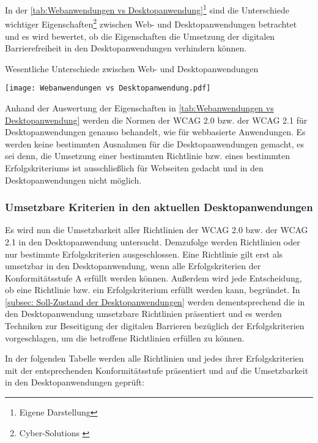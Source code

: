 In der \cref{tab:Webanwendungen vs Desktopanwendung}\footnote{Eigene Darstellung} sind die Unterschiede wichtiger Eigenschaften\footnote{Cyber-Solutions \cite{CyberSolutions}} zwischen Web- und Desktopanwendungen betrachtet und es wird bewertet, ob die Eigenschaften die Umsetzung der digitalen Barrierefreiheit in den Desktopanwendungen verhindern können.

\begin{table}[H]
	\caption{Wesentliche Unterschiede zwischen  Web- und Desktopanwendungen}
	\label{tab:Webanwendungen vs Desktopanwendung}
	\centering
	\texttt{[image: Webanwendungen vs Desktopanwendung.pdf]}
\end{table}

Anhand der Auswertung der Eigenschaften in \cref{tab:Webanwendungen vs Desktopanwendung} werden die Normen der \ac{WCAG} 2.0 bzw. der \ac{WCAG} 2.1 für Desktopanwendungen genauso behandelt, wie für webbasierte Anwendungen. Es werden keine bestimmten Ausnahmen für die Desktopanwendungen gemacht, es sei denn, die Umsetzung einer bestimmten Richtlinie bzw. eines bestimmten Erfolgskriteriums ist ausschließlich für Webseiten gedacht und in den Desktopanwendungen nicht möglich.

\subsubsection{Umsetzbare Kriterien in den aktuellen Desktopanwendungen}
\label{subsec: Umsetzbare Kriterien}

Es wird nun die Umsetzbarkeit aller Richtlinien der \ac{WCAG} 2.0 bzw. der \ac{WCAG} 2.1 in den Desktopanwendung untersucht. Demzufolge werden Richtlinien oder nur bestimmte Erfolgskriterien ausgeschlossen. Eine Richtlinie gilt erst als umsetzbar in den Desktopanwendung, wenn alle Erfolgskriterien der Konformitätsstufe A erfüllt werden können. Außerdem wird  jede Entscheidung, ob eine Richtlinie bzw. ein Erfolgskriterium erfüllt werden kann, begründet. In \cref{subsec: Soll-Zustand der Desktopanwendungen} werden dementsprechend die in den Desktopanwendung umsetzbare Richtlinien präsentiert und es werden Techniken zur Beseitigung der digitalen Barrieren bezüglich der Erfolgskriterien vorgeschlagen, um die betroffene Richtlinien erfüllen zu können.

In der folgenden Tabelle werden alle Richtlinien und jedes ihrer Erfolgskriterien mit der entsprechenden Konformitätsstufe präsentiert und auf die Umsetzbarkeit in den Desktopanwendungen geprüft:
\\

